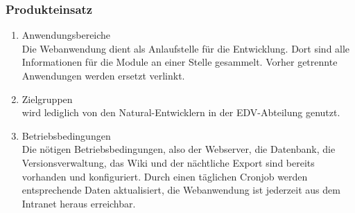 \subsubsection*{Produkteinsatz}

\begin{enumerate}[itemsep=0em,partopsep=0em,parsep=0em,topsep=0em]
\item{Anwendungsbereiche\\
Die Webanwendung dient als Anlaufstelle für die Entwicklung. Dort sind alle Informationen für die Module an einer Stelle gesammelt. Vorher getrennte Anwendungen werden ersetzt \bzw verlinkt.}
\item{Zielgruppen\\
\NI wird lediglich von den Natural-Entwicklern in der EDV-Abteilung genutzt.}
\item{Betriebsbedingungen\\ %
Die nötigen Betriebsbedingungen, also der Webserver, die Datenbank, die Versionsverwaltung, das Wiki und der nächtliche Export sind bereits vorhanden und konfiguriert. Durch einen täglichen Cronjob werden entsprechende Daten aktualisiert, die Webanwendung ist jederzeit aus dem Intranet heraus erreichbar.}
\end{enumerate}
